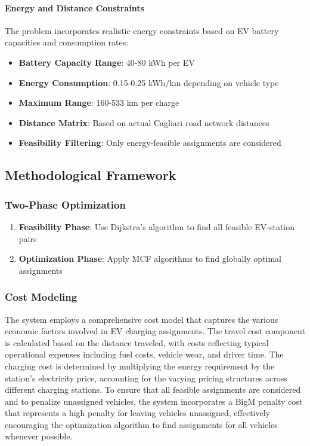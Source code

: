 \documentclass[12pt,a4paper]{article}
\begin{document}
\paragraph{Energy and Distance Constraints}
The problem incorporates realistic energy constraints based on EV battery capacities and consumption rates:

\begin{itemize}
\item \textbf{Battery Capacity Range}: 40-80 kWh per EV
\item \textbf{Energy Consumption}: 0.15-0.25 kWh/km depending on vehicle type
\item \textbf{Maximum Range}: 160-533 km per charge
\item \textbf{Distance Matrix}: Based on actual Cagliari road network distances
\item \textbf{Feasibility Filtering}: Only energy-feasible assignments are considered
\end{itemize}

\subsection{Methodological Framework}

\subsubsection{Two-Phase Optimization}
\begin{enumerate}
    \item \textbf{Feasibility Phase}: Use Dijkstra's algorithm to find all feasible EV-station pairs
    \item \textbf{Optimization Phase}: Apply MCF algorithms to find globally optimal assignments
\end{enumerate}

\subsubsection{Cost Modeling}

The system employs a comprehensive cost model that captures the various economic factors involved in EV charging assignments. The travel cost component is calculated based on the distance traveled, with costs reflecting typical operational expenses including fuel costs, vehicle wear, and driver time. The charging cost is determined by multiplying the energy requirement by the station's electricity price, accounting for the varying pricing structures across different charging stations. To ensure that all feasible assignments are considered and to penalize unassigned vehicles, the system incorporates a BigM penalty cost that represents a high penalty for leaving vehicles unassigned, effectively encouraging the optimization algorithm to find assignments for all vehicles whenever possible.
\end{document}
